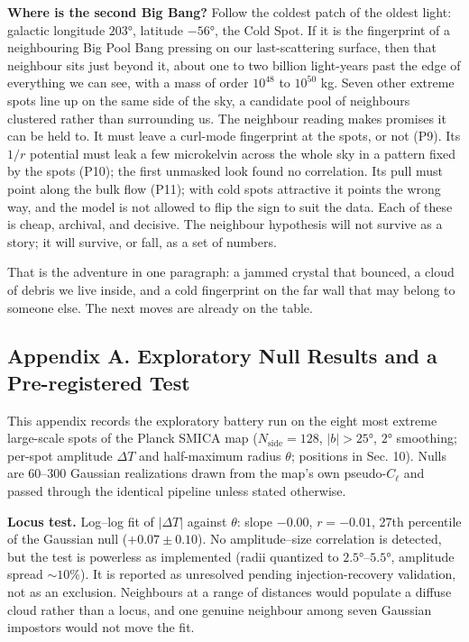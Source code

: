 \documentclass[
]{article}
\begin{document}
\textbf{Where is the second Big Bang?} Follow the coldest patch of the
oldest light: galactic longitude \(203°\), latitude \(-56°\), the Cold
Spot. If it is the fingerprint of a neighbouring Big Pool Bang pressing
on our last-scattering surface, then that neighbour sits just beyond it,
about one to two billion light-years past the edge of everything we can
see, with a mass of order \(10^{48}\) to \(10^{50}\) kg. Seven other
extreme spots line up on the same side of the sky, a candidate pool of
neighbours clustered rather than surrounding us. The neighbour reading
makes promises it can be held to. It must leave a curl-mode fingerprint
at the spots, or not (P9). Its \(1/r\) potential must leak a few
microkelvin across the whole sky in a pattern fixed by the spots (P10);
the first unmasked look found no correlation. Its pull must point along
the bulk flow (P11); with cold spots attractive it points the wrong way,
and the model is not allowed to flip the sign to suit the data. Each of
these is cheap, archival, and decisive. The neighbour hypothesis will
not survive as a story; it will survive, or fall, as a set of numbers.

That is the adventure in one paragraph: a jammed crystal that bounced, a
cloud of debris we live inside, and a cold fingerprint on the far wall
that may belong to someone else. The next moves are already on the
table.

\hypertarget{appendix-a.-exploratory-null-results-and-a-pre-registered-test}{%
\subsection{\texorpdfstring{\textbf{Appendix A. Exploratory Null Results
and a Pre-registered
Test}}{Appendix A. Exploratory Null Results and a Pre-registered Test}}\label{appendix-a.-exploratory-null-results-and-a-pre-registered-test}}

This appendix records the exploratory battery run on the eight most
extreme large-scale spots of the Planck SMICA map
(\(N_{\text{side}} = 128\), \(|b| > 25°\), \(2°\) smoothing; per-spot
amplitude \(\Delta T\) and half-maximum radius \(\theta\); positions in
Sec. 10). Nulls are 60--300 Gaussian realizations drawn from the map's
own pseudo-\(C_\ell\) and passed through the identical pipeline unless
stated otherwise.

\textbf{Locus test.} Log--log fit of \(|\Delta T|\) against \(\theta\):
slope \(-0.00\), \(r = -0.01\), 27th percentile of the Gaussian null
(\(+0.07 \pm 0.10\)). No amplitude--size correlation is detected, but
the test is powerless as implemented (radii quantized to
\(2.5°\)--\(5.5°\), amplitude spread \(\sim\!10\%\)). It is reported as
unresolved pending injection-recovery validation, not as an exclusion.
Neighbours at a range of distances would populate a diffuse cloud rather
than a locus, and one genuine neighbour among seven Gaussian impostors
would not move the fit.
\end{document}

